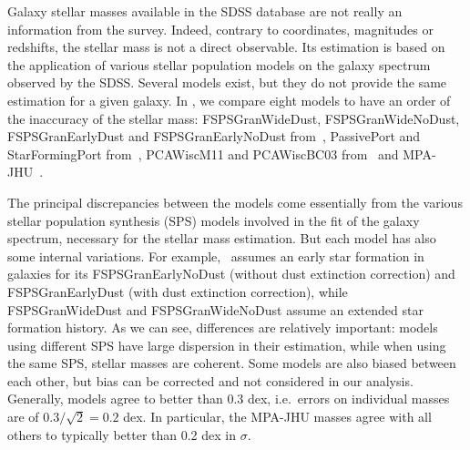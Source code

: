 Galaxy stellar masses available in the SDSS database are not really an
information from the survey. Indeed, contrary to coordinates, magnitudes or
redshifts, the stellar mass is not a direct observable. Its estimation is based
on the application of various stellar population models on the galaxy
spectrum observed by the SDSS\@. Several models exist, but they do not provide
the same estimation for a given galaxy. In ,
we compare eight models to have an order of the inaccuracy of the stellar mass:
FSPSGranWideDust, FSPSGranWideNoDust, FSPSGranEarlyDust and FSPSGranEarlyNoDust
from~\cite{Conroy+09}, PassivePort and StarFormingPort from~\cite{Maraston+09},
PCAWiscM11 and PCAWiscBC03 from~\cite{Chen+12} and MPA-JHU~\cite{Brinchmann+04,
Kauffmann+03, Tremonti+04}.

The principal discrepancies between the models come essentially from the
various stellar population synthesis (SPS) models involved in the fit of the
galaxy spectrum, necessary for the stellar mass estimation. But each model has
also some internal variations. For example,~\cite{Conroy+09} assumes an early
star formation in galaxies for its FSPSGranEarlyNoDust (without dust extinction
correction) and FSPSGranEarlyDust (with dust extinction correction), while
FSPSGranWideDust and FSPSGranWideNoDust assume an extended star formation
history. As we can see, differences are relatively important: models using
different SPS have large dispersion in their estimation, while when using the
same SPS, stellar masses are coherent. Some models are also biased between each
other, but bias can be corrected and not considered in our analysis. Generally,
models agree to better than 0.3 dex, i.e.\ errors on individual masses are of
$0.3 / \sqrt{2} = 0.2$ dex. In particular, the MPA-JHU masses agree with all
others to typically better than 0.2 dex in $\sigma$.

